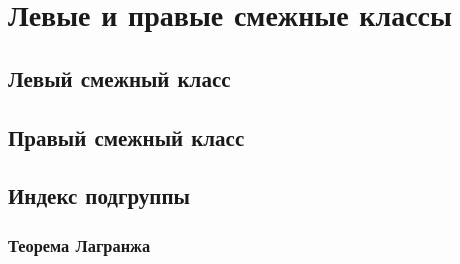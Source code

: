 \section{Левые и правые смежные классы}
\subsection{Левый смежный класс}
\subsection{Правый смежный класс}

\subsection{Индекс подгруппы}

\subsubsection{Теорема Лагранжа}
